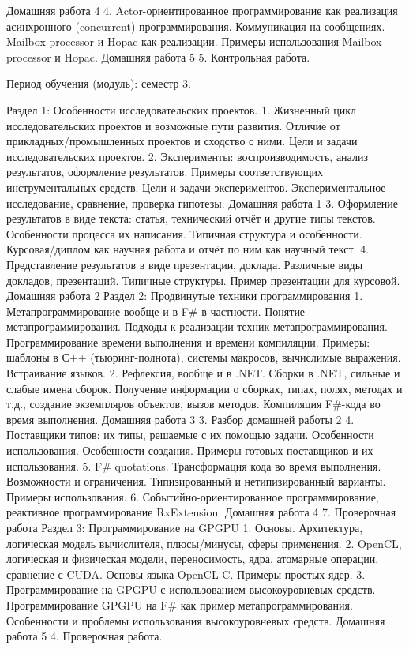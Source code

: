 Домашняя работа 4
    4. Actor-ориентированное программирование как реализация асинхронного (concurrent) программирования. Коммуникация на сообщениях. Mailbox processor и Hopac как реализации. Примеры использования Mailbox processor и Hopac.
Домашняя работа 5
    5. Контрольная работа.

Период обучения (модуль): семестр 3.

Раздел 1: Особенности исследовательских проектов.
    1. Жизненный цикл исследовательских проектов и возможные пути развития. Отличие от прикладных/промышленных проектов и сходство с ними. Цели и задачи исследовательских проектов. 
    2. Эксперименты: воспроизводимость, анализ результатов, оформление результатов. Примеры соответствующих инструментальных средств. Цели и задачи экспериментов. Экспериментальное исследование, сравнение, проверка гипотезы.
Домашняя работа 1
    3. Оформление результатов в виде текста: статья, технический отчёт и другие типы текстов. Особенности процесса их написания. Типичная структура и особенности. Курсовая/диплом как научная работа и отчёт по ним как научный текст.
    4. Представление результатов в виде презентации, доклада. Различные виды докладов, презентаций. Типичные структуры. Пример презентации для курсовой.
Домашняя работа 2
Раздел 2: Продвинутые техники программирования 
    1. Метапрограммирование вообще и в F# в частности. Понятие метапрограммирования. Подходы к реализации техник метапрограммирования.  Программирование времени выполнения и времени компиляции. Примеры: шаблоны в С++ (тьюринг-полнота), системы макросов, вычислимые выражения. Встраивание языков.
    2. Рефлексия, вообще и в .NET. Сборки в .NET, сильные и слабые имена сборок. Получение информации о сборках, типах, полях, методах и т.д., создание экземпляров объектов, вызов методов. Компиляция F#-кода во время выполнения.
Домашняя работа 3
    3. Разбор домашней работы 2   
    4. Поставщики типов: их типы, решаемые с их помощью задачи. Особенности использования. Особенности создания. Примеры готовых поставщиков и их использования.
    5. F# quotations. Трансформация кода во время выполнения. Возможности и ограничения. Типизированный и нетипизированный варианты. Примеры использования.
    6. Событийно-ориентированное программирование, реактивное программирование RxExtension.
Домашняя работа 4
    7. Проверочная работа
Раздел 3: Программирование на GPGPU
    1. Основы. Архитектура, логическая модель вычислителя, плюсы/минусы, сферы применения.
    2. OpenCL, логическая и физическая модели, переносимость, ядра, атомарные операции, сравнение с CUDA. Основы языка OpenCL C. Примеры простых ядер.
    3. Программирование на GPGPU с использованием высокоуровневых средств. Программирование GPGPU на F# как пример метапрограммирования. Особенности и проблемы использования высокоуровневых средств.
Домашняя работа 5
    4. Проверочная работа.

